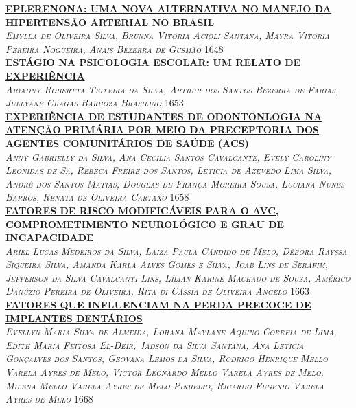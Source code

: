 \noindent \textsc{\hyperlink{trabalhos/250579.pdf.1}{\textbf{EPLERENONA: UMA NOVA ALTERNATIVA NO MANEJO DA HIPERTENSÃO ARTERIAL NO BRASIL}}}\\ 
\noindent \textsc{\textit{Emylla de Oliveira Silva, Brunna Vitória Acioli Santana, Mayra Vitória Pereira Nogueira, Anaís Bezerra de Gusmão}} \hfill 1648\\ 

\noindent \textsc{\hyperlink{trabalhos/250239.pdf.1}{\textbf{ESTÁGIO NA PSICOLOGIA ESCOLAR: UM RELATO DE EXPERIÊNCIA}}}\\ 
\noindent \textsc{\textit{Ariadny Robertta Teixeira da Silva, Arthur dos Santos Bezerra de Farias, Jullyane Chagas Barboza Brasilino}} \hfill 1653\\ 

\noindent \textsc{\hyperlink{trabalhos/251376.pdf.1}{\textbf{EXPERIÊNCIA DE ESTUDANTES DE ODONTONLOGIA NA ATENÇÃO PRIMÁRIA POR MEIO DA PRECEPTORIA DOS AGENTES COMUNITÁRIOS DE SAÚDE (ACS)}}}\\ 
\noindent \textsc{\textit{Anny Gabrielly da Silva, Ana Cecília Santos Cavalcante, Evely Caroliny Leonidas de Sá, Rebeca Freire dos Santos, Letícia de Azevedo Lima Silva, Andrê dos Santos Matias, Douglas de França Moreira Sousa, Luciana Nunes Barros, Renata de Oliveira Cartaxo}} \hfill 1658\\ 

\noindent \textsc{\hyperlink{trabalhos/251525.pdf.1}{\textbf{FATORES DE RISCO MODIFICÁVEIS PARA O AVC, COMPROMETIMENTO NEUROLÓGICO E GRAU DE INCAPACIDADE }}}\\ 
\noindent \textsc{\textit{Ariel Lucas Medeiros da Silva, Laiza Paula Cândido de Melo, Débora Rayssa Siqueira Silva, Amanda Karla Alves Gomes e Silva, Joab Lins de Serafim, Jefferson da Silva Cavalcanti Lins, Lílian Karine Machado de Souza, Américo Danúzio Pereira de Oliveira, Rita di Cássia de Oliveira Angelo}} \hfill 1663\\ 

\noindent \textsc{\hyperlink{trabalhos/251772.pdf.1}{\textbf{FATORES QUE INFLUENCIAM NA PERDA PRECOCE DE IMPLANTES DENTÁRIOS}}}\\ 
\noindent \textsc{\textit{Evellyn Maria Silva de Almeida, Lohana Maylane Aquino Correia de Lima, Edith Maria Feitosa El-Deir, Jadson da Silva Santana, Ana Letícia Gonçalves dos Santos, Geovana Lemos da Silva, Rodrigo Henrique Mello Varela Ayres de Melo, Victor Leonardo Mello Varela Ayres de Melo, Milena Mello Varela Ayres de Melo Pinheiro, Ricardo Eugenio Varela Ayres de Melo}} \hfill 1668\\ 

